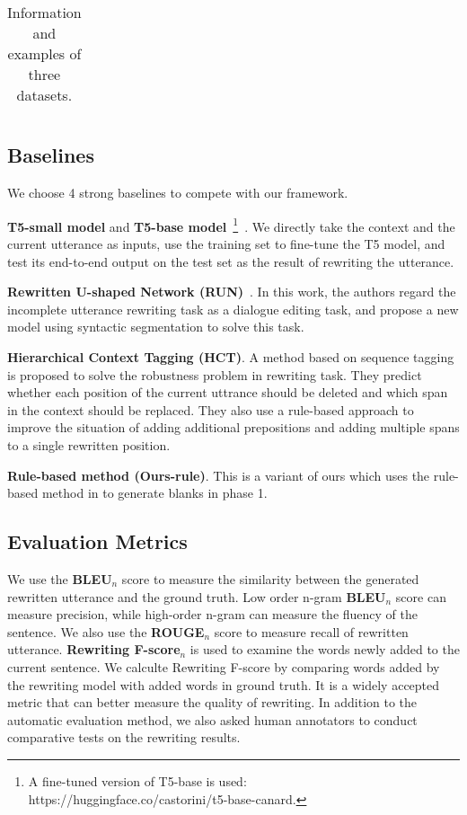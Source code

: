 \begin{table}[th]
{\begin{tabular}{lll}
\bottomrule
\end{tabular}}
\caption{Information and examples of three datasets.}
\label{tab:datasets-samples}
\end{table}

\subsection{Baselines}
We choose 4 strong baselines 
to compete with our framework.

\noindent
\textbf{T5-small model} and \textbf{T5-base model}~\footnote{A fine-tuned version of T5-base is used:\\ https://huggingface.co/castorini/t5-base-canard.}~\citep{2020t5}. 
We directly take the context and the current utterance as inputs, use the training set to fine-tune the T5 model, and test its end-to-end output on the test set as the result of rewriting the utterance.

\noindent
\textbf{Rewritten U-shaped Network (RUN)}~\citep{liu-etal-2020-incomplete}. 
In this work, the authors regard the incomplete utterance rewriting task as a dialogue editing task, and propose a new model using syntactic segmentation to solve this task.

\noindent
\textbf{Hierarchical Context Tagging (HCT)}\citep{hct}. A method based on sequence tagging is proposed to solve the robustness problem in rewriting task. They predict whether each position of the current uttrance should be deleted and which span in the context should be replaced. They also use a rule-based approach to improve the situation of adding additional prepositions and adding multiple spans to a single rewritten position.

\noindent
\textbf{Rule-based method (Ours-rule)}. This is a variant of ours which
uses the rule-based method in  to generate blanks in phase 1.

\subsection{Evaluation Metrics}
We use the \textbf{BLEU}$_n$ score \citep{papineni-etal-2002-bleu} to measure the similarity between the generated rewritten utterance and the ground truth. Low order n-gram \textbf{BLEU}$_n$ score can measure precision, while high-order n-gram can measure the fluency of the sentence. 
We also use the \textbf{ROUGE}$_n$ score \citep{lin-2004-rouge} to measure recall of rewritten utterance. 
\textbf{Rewriting F-score}$_n$ \citep{pan-etal-2019-improving}
is used to examine the words newly added to the current sentence. 
We calculte Rewriting F-score by comparing words added by the rewriting model with added words in ground truth.
It is a widely accepted metric that can better measure the quality of rewriting. In addition to the automatic evaluation method, we also asked human annotators to conduct comparative tests on the rewriting results.

